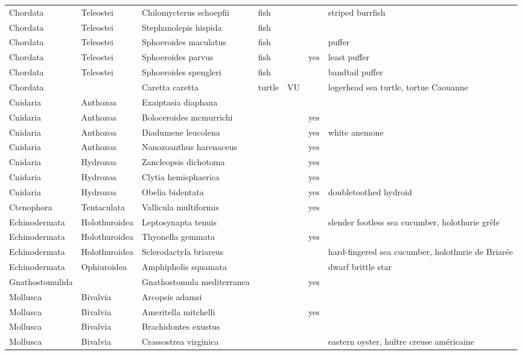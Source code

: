 \begin{longtable}{lllllll}
  Chordata & Teleostei & Chilomycterus schoepfii & fish &  &  & striped burrfish \\ 
  Chordata & Teleostei & Stephanolepis hispida & fish &  &  &  \\ 
  Chordata & Teleostei & Sphoeroides maculatus & fish &  &  & puffer \\ 
  Chordata & Teleostei & Sphoeroides parvus & fish &  & yes & least puffer \\ 
  Chordata & Teleostei & Sphoeroides spengleri & fish &  &  & bandtail puffer \\ 
  Chordata &  & Caretta caretta & turtle & VU &  & logerhead sea turtle, tortue Caouanne \\ 
  Cnidaria & Anthozoa & Exaiptasia diaphana &  &  &  &  \\ 
  Cnidaria & Anthozoa & Boloceroides mcmurrichi &  &  & yes &  \\ 
  Cnidaria & Anthozoa & Diadumene leucolena &  &  & yes & white anemone \\ 
  Cnidaria & Anthozoa & Nanozoanthus harenaceus &  &  & yes &  \\ 
  Cnidaria & Hydrozoa & Zancleopsis dichotoma &  &  & yes &  \\ 
  Cnidaria & Hydrozoa & Clytia hemisphaerica &  &  & yes &  \\ 
  Cnidaria & Hydrozoa & Obelia bidentata &  &  & yes & doubletoothed hydroid \\ 
  Ctenophora & Tentaculata & Vallicula multiformis &  &  & yes &  \\ 
  Echinodermata & Holothuroidea & Leptosynapta tenuis &  &  &  & slender footless sea cucumber, holothurie grêle \\ 
  Echinodermata & Holothuroidea & Thyonella gemmata &  &  & yes &  \\ 
  Echinodermata & Holothuroidea & Sclerodactyla briareus &  &  &  & hard-fingered sea cucumber, holothurie de Briarée \\ 
  Echinodermata & Ophiuroidea & Amphipholis squamata &  &  &  & dwarf brittle star \\ 
  Gnathostomulida &  & Gnathostomula mediterranea &  &  & yes &  \\ 
  Mollusca & Bivalvia & Arcopsis adamsi &  &  &  &  \\ 
  Mollusca & Bivalvia & Ameritella mitchelli &  &  & yes &  \\ 
  Mollusca & Bivalvia & Brachidontes exustus &  &  &  &  \\ 
  Mollusca & Bivalvia & Crassostrea virginica &  &  &  & eastern oyster, huître creuse américaine \\ 

\end{longtable}
